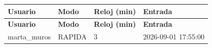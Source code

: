 \begin{center}\footnotesize\setlength{\tabcolsep}{2pt}
\begin{longtable}{|L{113.3pt}|L{92.7pt}|L{66.7pt}|L{180.7pt}|}
\hline
\textbf{\hspace{0pt}Usuario} & \textbf{\hspace{0pt}Modo} & \textbf{\hspace{0pt}Reloj (min)} & \textbf{\hspace{0pt}Entrada} \\ \hline
\endfirsthead
\hline
\textbf{\hspace{0pt}Usuario} & \textbf{\hspace{0pt}Modo} & \textbf{\hspace{0pt}Reloj (min)} & \textbf{\hspace{0pt}Entrada} \\ \hline
\endhead
marta\_\allowbreak{}muros & RAPIDA & 3 & 2026-09-01 17:55:00 \\ \hline
\end{longtable}
\end{center}
